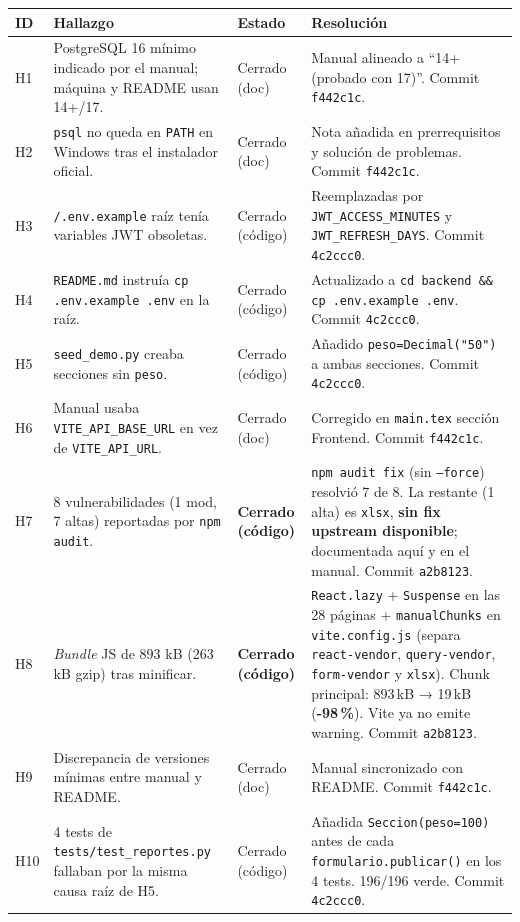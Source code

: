 \documentclass{computacion}
\begin{document}
\begin{longtable}{p{} p{} p{} p{}}
    \toprule
    \textbf{ID} & \textbf{Hallazgo} & \textbf{Estado} & \textbf{Resolución} \\
    \midrule
    \endhead
    H1 & PostgreSQL 16 mínimo indicado por el manual; máquina y README usan 14+/17. & Cerrado (doc) & Manual alineado a ``14+ (probado con 17)''. Commit \texttt{f442c1c}. \\
    \midrule
    H2 & \texttt{psql} no queda en \texttt{PATH} en Windows tras el instalador oficial. & Cerrado (doc) & Nota añadida en prerrequisitos y solución de problemas. Commit \texttt{f442c1c}. \\
    \midrule
    H3 & \texttt{/.env.example} raíz tenía variables JWT obsoletas. & Cerrado (código) & Reemplazadas por \texttt{JWT\_ACCESS\_MINUTES} y \texttt{JWT\_REFRESH\_DAYS}. Commit \texttt{4c2ccc0}. \\
    \midrule
    H4 & \texttt{README.md} instruía \texttt{cp .env.example .env} en la raíz. & Cerrado (código) & Actualizado a \texttt{cd backend \&\& cp .env.example .env}. Commit \texttt{4c2ccc0}. \\
    \midrule
    H5 & \texttt{seed\_demo.py} creaba secciones sin \texttt{peso}. & Cerrado (código) & Añadido \texttt{peso=Decimal("50")} a ambas secciones. Commit \texttt{4c2ccc0}. \\
    \midrule
    H6 & Manual usaba \texttt{VITE\_API\_BASE\_URL} en vez de \texttt{VITE\_API\_URL}. & Cerrado (doc) & Corregido en \texttt{main.tex} sección Frontend. Commit \texttt{f442c1c}. \\
    \midrule
    H7 & 8 vulnerabilidades (1 mod, 7 altas) reportadas por \texttt{npm audit}. & \textbf{Cerrado (código)} & \texttt{npm audit fix} (sin \texttt{--force}) resolvió 7 de 8. La restante (1 alta) es \texttt{xlsx}, \textbf{sin fix upstream disponible}; documentada aquí y en el manual. Commit \texttt{a2b8123}. \\
    \midrule
    H8 & \emph{Bundle} JS de 893 kB (263 kB gzip) tras minificar. & \textbf{Cerrado (código)} & \texttt{React.lazy} + \texttt{Suspense} en las 28 páginas + \texttt{manualChunks} en \texttt{vite.config.js} (separa \texttt{react-vendor}, \texttt{query-vendor}, \texttt{form-vendor} y \texttt{xlsx}). Chunk principal: 893\,kB → 19\,kB (\textbf{{-}98\,\%}). Vite ya no emite warning. Commit \texttt{a2b8123}. \\
    \midrule
    H9 & Discrepancia de versiones mínimas entre manual y README. & Cerrado (doc) & Manual sincronizado con README. Commit \texttt{f442c1c}. \\
    \midrule
    H10 & 4 tests de \texttt{tests/test\_reportes.py} fallaban por la misma causa raíz de H5. & Cerrado (código) & Añadida \texttt{Seccion(peso=100)} antes de cada \texttt{formulario.publicar()} en los 4 tests. 196/196 verde. Commit \texttt{4c2ccc0}. \\
    \bottomrule
\end{longtable}
\end{document}
